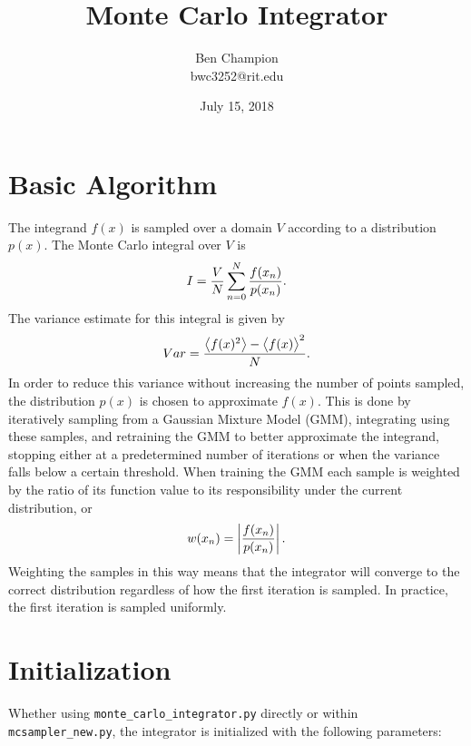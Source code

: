 \documentclass{article}
\title{Monte Carlo Integrator}
\date{July 15, 2018}
\author{Ben Champion \\ bwc3252@rit.edu}
\begin{document}
\maketitle

\section{Basic Algorithm}

The integrand $f(x)$ is sampled over a domain $V$ according to a distribution
$p(x)$. The Monte Carlo integral over $V$ is
\begin{equation}
    I = {{V \over N} \sum_{n=0}^{N} {f(x_n) \over {p(x_n)}}}.
\end{equation}
The variance estimate for this integral is given by
\begin{equation}
    Var = {{\big \langle f(x)^2 \big \rangle - \big \langle f(x)
    \big \rangle^2} \over N}.
\end{equation}
In order to reduce this variance without increasing the number of points
sampled, the distribution $p(x)$ is chosen to approximate $f(x)$. This is done
by iteratively sampling from a Gaussian Mixture Model (GMM), integrating using
these samples, and retraining the GMM to better approximate the integrand,
stopping either at a predetermined number of iterations or when the variance
falls below a certain threshold. When training the GMM each sample is weighted
by the ratio of its function value to its responsibility under the current
distribution, or
\begin{equation}
    w(x_n) = \left| {f(x_n) \over p(x_n)} \right|.
\end{equation}
Weighting the samples in this way means that the integrator will converge to
the correct distribution regardless of how the first iteration is sampled. In
practice, the first iteration is sampled uniformly.

\section{Initialization}

Whether using \texttt{monte\_carlo\_integrator.py} directly or within
\texttt{mcsampler\_new.py}, the integrator is initialized with the following
parameters:
\end{document}
